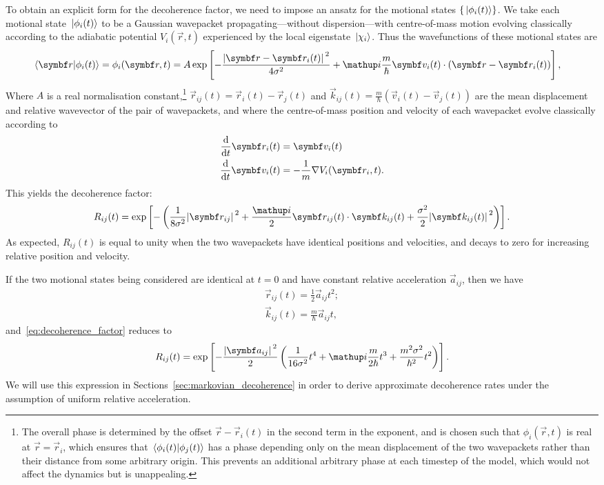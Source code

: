 To obtain an explicit form for the decoherence factor, we need to impose an ansatz for the motional states $\{\ket{\phi_i(t)}\}$. We take each motional state $\ket{\phi_i(t)}$ to be a Gaussian wavepacket propagating---without dispersion---with centre-of-mass motion evolving classically according to the adiabatic potential $V_i(\vec r, t)$ experienced by the local eigenstate $\ket{\chi_i}$. Thus the wavefunctions of these motional states are
\begin{align}
\braket{\vec r}{\phi_i(t)} &= \phi_i(\vec r, t) = A\exp\left[-\frac{\abs{\vec r - \vec r_i(t)}^2}{4\sigma^2} + \ii \frac m\hbar \vec v_i(t)\cdot (\vec r - \vec r_i(t))\right],
\end{align}
Where $A$ is a real normalisation constant,\footnote{The overall phase is determined by the offset $\vec r - \vec r_i(t)$ in the second term in the exponent, and is chosen such that $\phi_i(\vec r, t)$ is real at $\vec r=\vec r_i$, which ensures that $\braket{\phi_i(t)}{\phi_j(t)}$ has a phase depending only on the mean displacement of the two wavepackets rather than their distance from some arbitrary origin. This prevents an additional arbitrary phase at each timestep of the model, which would not affect the dynamics but is unappealing.} $\vec r_{ij}(t) = \vec r_i(t) - \vec r_j(t)$ and $\vec k_{ij}(t) = \frac m\hbar \left(\vec v_i(t) - \vec v_j(t)\right)$ are the mean displacement and relative wavevector of the pair of wavepackets, and where the centre-of-mass position and velocity of each wavepacket evolve classically according to
\begin{align}\label{eq:classical_const_a_first}
\dv{t} \vec r_i(t) &= \vec v_i(t)\\
\dv{t} \vec v_i(t) &= -\frac1m\nabla V_i(\vec r_i, t).
\label{eq:classical_const_a_second}
\end{align}
This yields the decoherence factor:
\begin{align}\label{eq:decoherence_factor}
R_{ij}(t) = \exp\left[-\left(\frac1{8\sigma^2}\abs{\vec r_{ij}}^2
+ \frac\ii 2 \vec r_{ij}(t) \cdot \vec k_{ij}(t) + \frac{\sigma^2}{2} \abs{\vec k_{ij}(t)}^2
\right)\right].
\end{align}
As expected, $R_{ij}(t)$ is equal to unity when the two wavepackets have identical positions and velocities, and decays to zero for increasing relative position and velocity. 

If the two motional states being considered are identical at $t=0$ and have constant relative acceleration $\vec a_{ij}$, then we have
\begin{align}
\vec r_{ij}(t) = \frac12\vec a_{ij} t^2;\\
\vec k_{ij}(t) = \frac m \hbar \vec a_{ij} t,
\end{align}
and~\eqref{eq:decoherence_factor} reduces to
\begin{align}\label{eq:const_a_decoherence_factor}
R_{ij}(t) = \exp\left[-\frac {\abs{\vec a_{ij}}^2} 2 \left(\frac1 {16\sigma^2}t^4 + \ii\frac m{2\hbar}t^3 + \frac{m^2\sigma^2}{\hbar^2} t^2 \right)\right].
\end{align}
We will use this expression in Sections~\ref{sec:markovian_decoherence} in order to derive approximate decoherence rates under the assumption of uniform relative acceleration.

